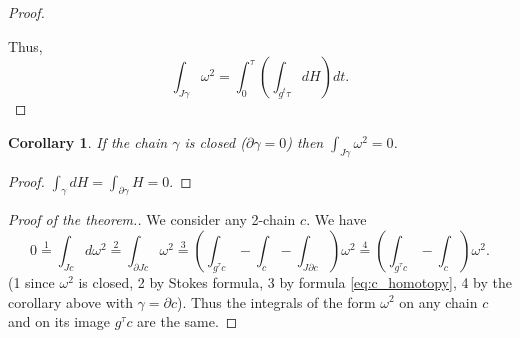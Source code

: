 \documentclass{book}
\numberwithin{equation}{section}
\theoremstyle{plain}
\newtheorem*{cor*}{Corollary}
\theoremstyle{definition}
\theoremstyle{remark}
\theoremstyle{remark}
\begin{document}
\begin{proof}
\begin{figure*}
    \caption*{Illustration of $\omega^2(\pmb\xi, \pmb\eta) = (\pmb\xi, \nabla H)$.
    The area spanned by $\pmb\xi$ and $\pmb\eta = IdH$ is equal
    to the projection of $\nabla H$ on $\pmb \xi$.}
  \end{figure*}
  Thus,
  $$
  \int_{J\gamma}\omega^2 = \int_0^\tau
  \left(
    \int_{g^t\tau} dH
  \right) dt.
  $$
\end{proof}


\begin{cor*}
  If the chain $\gamma$ is closed ($\partial \gamma = 0$)
  then $\int_{J\gamma} \omega^2 = 0$.
\end{cor*}

\begin{proof}
  $\int_\gamma dH = \int_{\partial \gamma} H = 0.$

\end{proof}

\begin{proof}[Proof of the theorem.]
  We consider any 2-chain $c$. We have
  $$
  0 \stackrel{1}{=} \int_{Jc} d\omega^2
  \stackrel{2}{=} \int_{\partial Jc} \omega^2
  \stackrel{3}{=}
  \left(
    \int_{g^\tau c}
    -\int_{c}
    -\int_{J\partial c}
  \right)
  \omega^2
  \stackrel{4}{=}
  \left(
    \int_{g^\tau c}
    -\int_{c}
  \right)
  \omega^2.
  $$
  (1 since $\omega^2$ is closed, 2 by Stokes formula,
  3 by formula \eqref{eq:c_homotopy},
  4 by the corollary above with $\gamma = \partial c$).
  Thus the integrals of the form $\omega^2$
  on any chain $c$ and on its image $g^\tau c$ are the same.
\end{proof}
\end{document}
